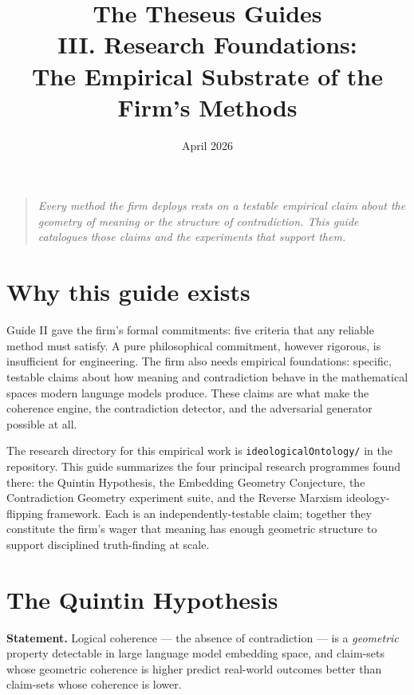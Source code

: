 \documentclass[11pt,letterpaper]{article}
\title{\textbf{The Theseus Guides}\\[6pt]\large III. Research Foundations:\\The Empirical Substrate of the Firm's Methods}
\date{April 2026}
\author{}
\newcommand{\file}[1]{\texttt{#1}}
\begin{document}
\maketitle
\thispagestyle{empty}

\begin{quote}\itshape
Every method the firm deploys rests on a testable empirical claim about the geometry of meaning or the structure of contradiction. This guide catalogues those claims and the experiments that support them.
\end{quote}

\vspace{1em}
\tableofcontents
\newpage

\section{Why this guide exists}

Guide II gave the firm's formal commitments: five criteria that any reliable method must satisfy. A pure philosophical commitment, however rigorous, is insufficient for engineering. The firm also needs empirical foundations: specific, testable claims about how meaning and contradiction behave in the mathematical spaces modern language models produce. These claims are what make the coherence engine, the contradiction detector, and the adversarial generator possible at all.

The research directory for this empirical work is \file{ideologicalOntology/} in the repository. This guide summarizes the four principal research programmes found there: the Quintin Hypothesis, the Embedding Geometry Conjecture, the Contradiction Geometry experiment suite, and the Reverse Marxism ideology-flipping framework. Each is an independently-testable claim; together they constitute the firm's wager that meaning has enough geometric structure to support disciplined truth-finding at scale.

\section{The Quintin Hypothesis}

\textbf{Statement.} Logical coherence --- the absence of contradiction --- is a \emph{geometric} property detectable in large language model embedding space, and claim-sets whose geometric coherence is higher predict real-world outcomes better than claim-sets whose coherence is lower.
\end{document}
